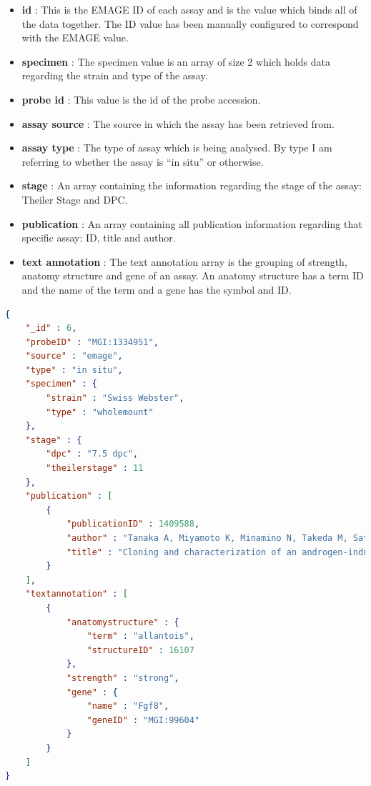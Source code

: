 \begin{itemize}
\item \textbf{id} : This is the EMAGE ID of each assay and is the value which binds all of the data together. The ID value has been manually configured to correspond with the EMAGE value.
\item \textbf{specimen} : The specimen value is an array of size 2 which holds data regarding the strain and type of the assay.
\item \textbf{probe id} : This value is the id of the probe accession.
\item \textbf{assay source} : The source in which the assay has been retrieved from.
\item \textbf{assay type} : The type of assay which is being analysed. By type I am referring to whether the assay is ``in situ'' or otherwise.
\item \textbf{stage} : An array containing the information regarding the stage of the assay: Theiler Stage and DPC.
\item \textbf{publication} : An array containing all publication information regarding that specific assay: ID, title and author.
\item \textbf{text annotation} : The text annotation array is the grouping of strength, anatomy structure and gene of an assay. An anatomy structure has a term ID and the name of the term and a gene has the symbol and ID.
\end{itemize}

\newpage
\begin{lstlisting}[language=json,caption=Example MongoDB document., label=code:mongoload]
{
    "_id" : 6,
    "probeID" : "MGI:1334951",
    "source" : "emage",
    "type" : "in situ",
    "specimen" : {
        "strain" : "Swiss Webster",
        "type" : "wholemount"
    },
    "stage" : {
        "dpc" : "7.5 dpc",
        "theilerstage" : 11
    },
    "publication" : [ 
        {
            "publicationID" : 1409588,
            "author" : "Tanaka A, Miyamoto K, Minamino N, Takeda M, Sato B, Matsuo H, Matsumoto K",
            "title" : "Cloning and characterization of an androgen-induced growth factor essential for the androgen-dependent growth of mouse mammary carcinoma cells."
        }
    ],
    "textannotation" : [ 
        {
            "anatomystructure" : {
                "term" : "allantois",
                "structureID" : 16107
            },
            "strength" : "strong",
            "gene" : {
                "name" : "Fgf8",
                "geneID" : "MGI:99604"
            }
        }
    ]
}
\end{lstlisting}
\newpage
